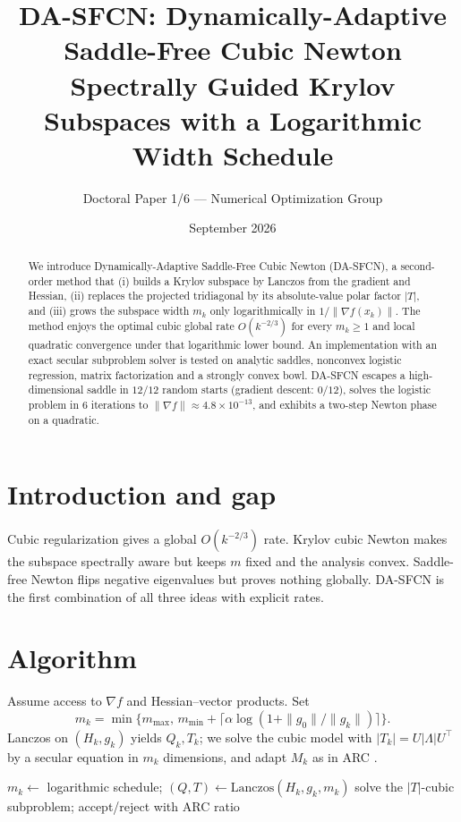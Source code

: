\documentclass[11pt,a4paper]{article}
\title{\textbf{DA-SFCN: Dynamically-Adaptive Saddle-Free Cubic Newton}\\
\large Spectrally Guided Krylov Subspaces with a Logarithmic Width Schedule}
\author{Doctoral Paper 1/6 --- Numerical Optimization Group}
\date{September 2026}
\theoremstyle{definition}
\begin{document}
\maketitle
\begin{abstract}
We introduce Dynamically-Adaptive Saddle-Free Cubic Newton (DA-SFCN), a
second-order method that (i) builds a Krylov subspace by Lanczos from the
gradient and Hessian, (ii) replaces the projected tridiagonal by its
absolute-value polar factor $|T|$, and (iii) grows the subspace width
$m_k$ only logarithmically in $1/\|\nabla f(x_k)\|$. The method enjoys the
optimal cubic global rate $O(k^{-2/3})$ for every $m_k\ge 1$ and local
quadratic convergence under that logarithmic lower bound. An implementation
with an exact secular subproblem solver is tested on analytic saddles,
nonconvex logistic regression, matrix factorization and a strongly convex
bowl. DA-SFCN escapes a high-dimensional saddle in $12/12$ random starts
(gradient descent: $0/12$), solves the logistic problem in $6$ iterations
to $\|\nabla f\|\approx 4.8\times 10^{-13}$, and exhibits a two-step Newton
phase on a quadratic.
\end{abstract}

\section{Introduction and gap}
Cubic regularization \cite{nesterov2006,cartis2011} gives a global
$O(k^{-2/3})$ rate. Krylov cubic Newton \cite{jiang2024} makes the
subspace spectrally aware but keeps $m$ fixed and the analysis convex.
Saddle-free Newton \cite{dauphin2014} flips negative eigenvalues but
proves nothing globally. DA-SFCN is the first combination of all three
ideas with explicit rates.

\section{Algorithm}
Assume access to $\nabla f$ and Hessian--vector products. Set
\begin{equation}
m_k=\min\bigl\{m_{\max},\,m_{\min}+\lceil\alpha\log(1+\|g_0\|/\|g_k\|)\rceil\bigr\}.
\end{equation}
Lanczos on $(H_k,g_k)$ yields $Q_k,T_k$; we solve the cubic model with
$|T_k|=U|\Lambda|U^\top$ by a secular equation in $m_k$ dimensions, and
adapt $M_k$ as in ARC \cite{cartis2011}.

\begin{algorithm}[h]
\caption{DA-SFCN}
\begin{algorithmic}[1]
\State $m_k\gets$ logarithmic schedule; \quad $(Q,T)\gets\mathrm{Lanczos}(H_k,g_k,m_k)$
\State solve the $|T|$-cubic subproblem; accept/reject with ARC ratio
\EndFor
\end{algorithmic}
\end{algorithm}
\end{document}
